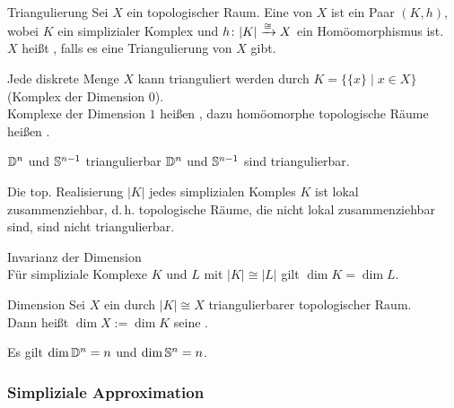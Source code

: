 \begin{Def}{Triangulierung}
    Sei $X$ ein topologischer Raum.
    Eine  von $X$ ist ein Paar $(K, h)$, wobei
    $K$ ein simplizialer Komplex und $h\colon |K| \xrightarrow{\cong} X$ ein
    Homöomorphismus ist. \\
    $X$ heißt ,
    falls es eine Triangulierung von $X$ gibt.
\end{Def}

\begin{Bsp}
    Jede diskrete Menge $X$ kann trianguliert werden durch
    $K = \{\{x\} \;|\; x \in X\}$ (Komplex der Dimension $0$). \\
    Komplexe der Dimension $1$ heißen ,
    dazu homöomorphe topologische Räume heißen .
\end{Bsp}

\begin{Satz}{$\mathbb{D}^n$ und $\mathbb{S}^{n-1}$ triangulierbar}
    $\mathbb{D}^n$ und $\mathbb{S}^{n-1}$ sind triangulierbar.
\end{Satz}

\begin{Bem}
    Die top. Realisierung $|K|$ jedes simplizialen Komples $K$ ist
    lokal zusammenziehbar, d.\,h. topologische Räume, die nicht
    lokal zusammenziehbar sind, sind nicht triangulierbar.
\end{Bem}

\linie

\begin{Satz}{Invarianz der Dimension}\\
    Für simpliziale Komplexe $K$ und $L$ mit $|K| \cong |L|$ gilt
    $\dim K = \dim L$.
\end{Satz}

\begin{Def}{Dimension}
    Sei $X$ ein durch $|K| \cong X$ triangulierbarer topologischer Raum. \\
    Dann heißt $\dim X := \dim K$ seine .
\end{Def}

\begin{Bsp}
    Es gilt $\dim \mathbb{D}^n = n$ und $\dim \mathbb{S}^n = n$.
\end{Bsp}

\pagebreak

\subsubsection{%
    Simpliziale Approximation%
}


